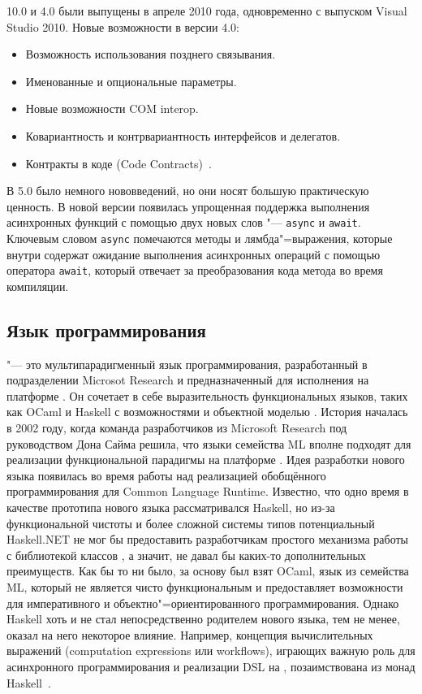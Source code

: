 \vbnet{} 10.0 и \csharp{} 4.0 были выпущены в апреле 2010 года, одновременно с выпуском Visual Studio 2010.
Новые возможности в версии 4.0:
\begin{itemize}
  \item Возможность использования позднего связывания.
  \item Именованные и опциональные параметры.
  \item Новые возможности COM interop.
  \item Ковариантность и контрвариантность интерфейсов и делегатов.
  \item Контракты в коде (Code Contracts)~\cite{csharp_wiki_2013_ru}.
\end{itemize}

В \csharp{} 5.0 было немного нововведений, но они носят большую практическую ценность.
В новой версии появилась упрощенная поддержка выполнения асинхронных функций с помощью двух новых слов "---  \lstinline[style=csharpinlinestyle]!async! и \lstinline[style=csharpinlinestyle]!await!.
Ключевым словом \lstinline[style=csharpinlinestyle]!async! помечаются методы и лямбда"=выражения, которые внутри содержат ожидание выполнения асинхронных операций с помощью оператора \lstinline[style=csharpinlinestyle]!await!, который отвечает за преобразования кода метода во время компиляции.



\subsection{Язык программирования \fsharp{}}
\label{sub:practice:fsharp_overview}
\fsharp{} "--- это мультипарадигменный язык программирования, разработанный в подразделении Microsot Research и предназначенный для исполнения на платформе \dotnet{}. 
Он сочетает в себе выразительность функциональных языков, таких как OCaml и Haskell с возможностями и объектной моделью \dotnet{}.
История \fsharp{} началась в 2002 году, когда команда разработчиков из Microsoft Research под руководством Дона Сайма решила, что языки семейства ML вполне подходят для реализации функциональной парадигмы на платформе \dotnet{}.
Идея разработки нового языка появилась во время работы над реализацией обобщённого программирования для Common Language Runtime.
Известно, что одно время в качестве прототипа нового языка рассматривался Haskell, но из-за функциональной чистоты и более сложной системы типов потенциальный Haskell.NET не мог бы предоставить разработчикам простого механизма работы с библиотекой классов \netfx{}, а значит, не давал бы каких-то дополнительных преимуществ.
Как бы то ни было, за основу был взят OCaml, язык из семейства ML, который не является чисто функциональным и предоставляет возможности для императивного и объектно"=ориентированного программирования.
Однако Haskell хоть и не стал непосредственно родителем нового языка, тем не менее, оказал на него некоторое влияние. 
Например, концепция вычислительных выражений (computation expressions или workflows), играющих важную роль для асинхронного программирования и реализации DSL на \fsharp{}, позаимствована из монад Haskell~\cite{fsharp_pfp_issue_5}.

